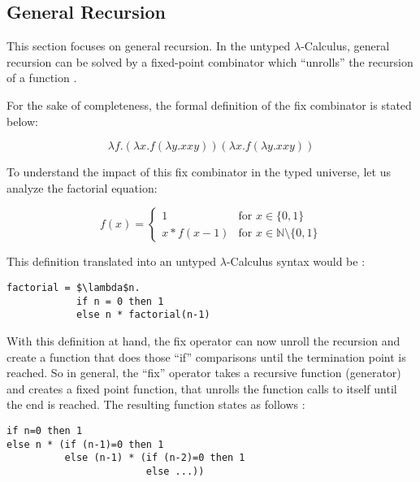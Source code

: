\subsection{General Recursion}

This section focuses on general recursion. In the untyped $\lambda$-Calculus,
general recursion can be solved by a fixed-point combinator
which ``unrolls'' the recursion of a function \cite{pierce2002ProgLang}.

For the sake of completeness, the formal definition of the fix combinator is stated below:

\begin{equation*}
    \tag{Fixed-Point Combinator}
    \lambda f. (\lambda x. f (\lambda y. x x y)) (\lambda x. f (\lambda y. x x y))
\end{equation*}

To understand the impact of this fix combinator in the typed universe, let
us analyze the factorial equation:

\begin{equation*}
    \tag{Recursive Factorial}
    f(x) =
    \begin{cases}
        1          & \text{for } x \in \{0,1\}                      \\
        x * f(x-1) & \text{for } x \in \mathbb{N} \setminus \{0,1\}
    \end{cases}
\end{equation*}

This definition translated into an untyped $\lambda$-Calculus syntax
would be \cite{pierce2002ProgLang}:

\begin{lstlisting}
factorial = $\lambda$n.
            if n = 0 then 1
            else n * factorial(n-1)
\end{lstlisting}

With this definition at hand, the fix operator can now unroll the recursion
and create a function that does those ``if'' comparisons until the
termination point is reached. So in general, the ``fix'' operator
takes a recursive function (generator) and creates a fixed point function, that unrolls
the function calls to itself until the end is reached.
The resulting function states as follows \cite{pierce2002ProgLang}:

\begin{lstlisting}
if n=0 then 1
else n * (if (n-1)=0 then 1
          else (n-1) * (if (n-2)=0 then 1
                        else ...))
\end{lstlisting}

